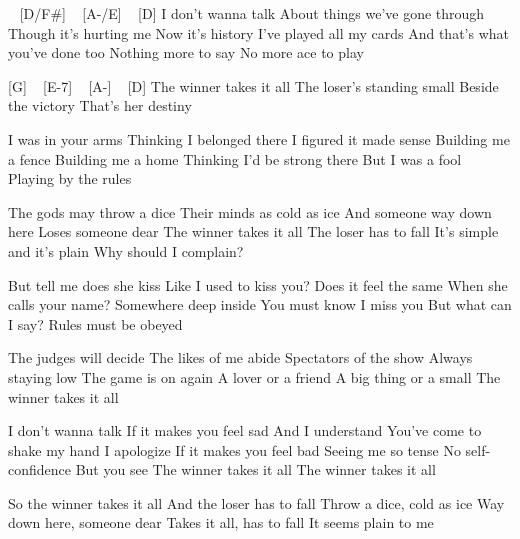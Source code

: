 \begin{guitar}
[G] ~ [D/F#] ~ [A-/E] ~ [D]
I don't wanna talk
About things we've gone through
Though it's hurting me
Now it's history
I've played all my cards
And that's what you've done too
Nothing more to say
No more ace to play

[G] ~ [E-7] ~ [A-] ~ [D]
The winner takes it all
The loser's standing small
Beside the victory
That's her destiny

I was in your arms
Thinking I belonged there
I figured it made sense
Building me a fence
Building me a home
Thinking I'd be strong there
But I was a fool
Playing by the rules

The gods may throw a dice
Their minds as cold as ice
And someone way down here
Loses someone dear
The winner takes it all
The loser has to fall
It's simple and it's plain
Why should I complain?

But tell me does she kiss
Like I used to kiss you?
Does it feel the same
When she calls your name?
Somewhere deep inside
You must know I miss you
But what can I say?
Rules must be obeyed

The judges will decide
The likes of me abide
Spectators of the show
Always staying low
The game is on again
A lover or a friend
A big thing or a small
The winner takes it all

I don't wanna talk
If it makes you feel sad
And I understand
You've come to shake my hand
I apologize
If it makes you feel bad
Seeing me so tense
No self-confidence
But you see
The winner takes it all
The winner takes it all

So the winner takes it all
And the loser has to fall
Throw a dice, cold as ice
Way down here, someone dear
Takes it all, has to fall
It seems plain to me 
\end{guitar}